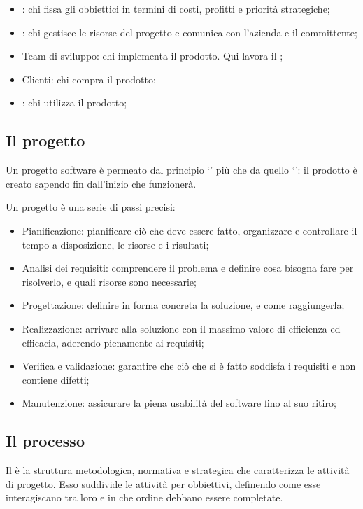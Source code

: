 \begin{itemize}
	\item {}: chi fissa gli obbiettici in termini di costi, profitti e priorità strategiche;
	\item {}: chi gestisce le risorse del progetto e comunica con l'azienda e il committente;
	\item Team di sviluppo: chi implementa il prodotto. Qui lavora il ;
	\item Clienti: chi compra il prodotto;
	\item {}: chi utilizza il prodotto;
\end{itemize}

\subsection{Il progetto}
Un progetto software è permeato dal principio `' più che da quello `': il prodotto è creato sapendo fin dall'inizio che funzionerà.

Un progetto è una serie di passi precisi:
\begin{itemize}
	\item Pianificazione: pianificare ciò che deve essere fatto, organizzare e controllare il tempo a disposizione, le risorse e i risultati;
	\item Analisi dei requisiti: comprendere il problema e definire cosa bisogna fare per risolverlo, e quali risorse sono necessarie;
	\item Progettazione: definire in forma concreta la soluzione, e come raggiungerla;
	\item Realizzazione: arrivare alla soluzione con il massimo valore di efficienza ed efficacia, aderendo pienamente ai requisiti;
	\item Verifica e validazione: garantire che ciò che si è fatto soddisfa i requisiti e non contiene difetti;
	\item Manutenzione: assicurare la piena usabilità del software fino al suo ritiro;
\end{itemize}

\subsection{Il processo}
Il  è la struttura metodologica, normativa e strategica che caratterizza le attività di progetto. Esso suddivide le attività per obbiettivi, definendo come esse interagiscano tra loro e in che ordine debbano essere completate.